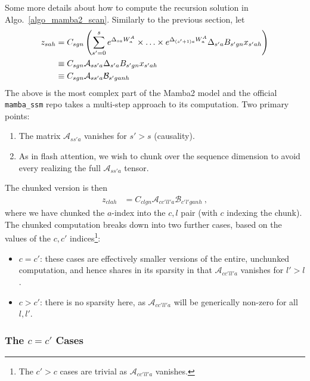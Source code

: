 Some more details about how to compute the recursion solution in Algo.~\ref{algo_mamba2_scan}.
Similarly to the previous section, let
\begin{align}
z _{ sah } &= C _{ sgn }\left (\sum _{ s'=0 }^{ s }e^{ \Delta _{ sa }W^{A} _{ a } }\times \ldots \times e^{ \Delta _{ (s'+1)a }W^{A} _{ a } } \Delta _{ s'a }B _{ s'gn } x _{ s'ah }\right )\nonumber\\
 &\equiv C _{ sgn }\mathcal{A}_{ ss'a }\Delta _{ s'a }B _{ s'gn } x _{ s'ah }\nonumber\\
 &\equiv C _{ sgn }\mathcal{A}_{ ss'a }\mathcal{B}_{ s'ganh }
\end{align}
The above is the most complex part of the Mamba2 model and the official \texttt{mamba\_ssm} repo
takes a multi-step approach to its computation. Two primary points:
\begin{enumerate}
    \item The matrix $ \mathcal{A}_{ ss'a  } $ vanishes for $ s' > s  $ (causality).
    \item As in flash attention, we wish to chunk over the sequence dimension to avoid every
        realizing the full $ \mathcal{A}_{ ss'a  } $ tensor.
\end{enumerate}
The chunked version is then
\begin{align}
    z _{ clah } &= C _{ clgn }\mathcal{A}_{cc' ll'a }\mathcal{B}_{ c'l'ganh } \ ,
\end{align}
where we have chunked the $ a  $-index into the $ c, l  $ pair (with $ c  $ indexing the chunk).
The chunked computation breaks down into two further cases, based on the values of the $ c, c'  $
indices\footnote{ The $ c'>c $ cases are trivial as $ \mathcal{A}_{ cc'll'a  } $ vanishes.}:
\begin{itemize}
    \item $ c=c' $: these cases are effectively smaller versions of the entire, unchunked
        computation, and hence shares in its sparsity in that $ \mathcal{A}_{ cc'll'a  }  $ vanishes
        for $ l' > l $.
    \item $ c>c' $: there is no sparsity here, as $ \mathcal{A}_{ cc'll'a  }  $ will be generically
        non-zero for all $ l, l' $.
\end{itemize}

\subsubsection{The $ c=c'  $ Cases}

